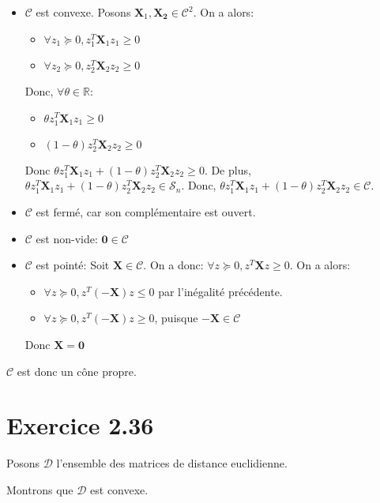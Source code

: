 \documentclass{article}
\begin{document}
\begin{itemize}
\item $\mathcal{C}$ est convexe. Posons $\mathbf{X}_ 1, \mathbf{X_2} \in
  \mathcal{C}^2$. On a alors:
  \begin{itemize}
    \item $\forall z_1 \succeq 0, z_1^T \mathbf{X}_1 z_1 \geq 0$
    \item $\forall z_2 \succeq 0, z_2^T \mathbf{X}_2 z_2 \geq 0$
  \end{itemize}
  Donc, $\forall \theta \in \mathbb{R}$:
    \begin{itemize}
      \item $\theta z_1^T \mathbf{X}_1 z_1 \geq 0$
      \item $(1 - \theta) z_2^T \mathbf{X}_2 z_2 \geq 0$
    \end{itemize}
  Donc $\theta z_1^T \mathbf{X}_1 z_1  + (1 - \theta) z_2^T \mathbf{X}_2 z_2
  \geq 0$. De plus, $\theta z_1^T \mathbf{X}_1 z_1  + (1 - \theta) z_2^T
  \mathbf{X}_2 z_2 \in \mathcal{S}_n$. Donc, $\theta z_1^T \mathbf{X}_1 z_1  + (1 - \theta) z_2^T
  \mathbf{X}_2 z_2 \in \mathcal{C}$.

\item $\mathcal{C}$ est fermé, car son complémentaire est ouvert.
\item $\mathcal{C}$ est non-vide: $\mathbf{0} \in \mathcal{C}$
\item $\mathcal{C}$ est pointé: Soit $\mathbf{X} \in \mathcal{C}$. On a donc:
$\forall z \succeq 0, z^T \mathbf{X} z \geq 0$. On a alors:
\begin{itemize}
  \item $\forall z \succeq 0, z^T (- \mathbf{X}) z \leq 0$ par l'inégalité précédente.
  \item $\forall z \succeq 0, z^T (- \mathbf{X}) z \geq 0$, puisque $- \mathbf{X} \in
  \mathcal{C}$
\end{itemize}

Donc $\mathbf{X} = \mathbf{0}$
\end{itemize}

$\mathcal{C}$ est donc un cône propre.

\section{Exercice 2.36}

Posons $\mathcal{D}$ l'ensemble des matrices de distance euclidienne.

Montrons que $\mathcal{D}$ est convexe.
\end{document}

